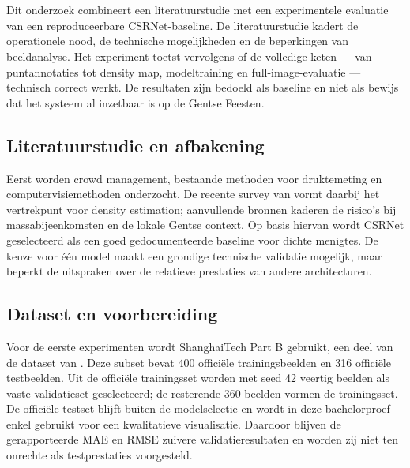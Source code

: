 
\chapter{}%
\label{ch:methodologie}

Dit onderzoek combineert een literatuurstudie met een experimentele evaluatie van een reproduceerbare CSRNet-baseline. De literatuurstudie kadert de operationele nood, de technische mogelijkheden en de beperkingen van beeldanalyse. Het experiment toetst vervolgens of de volledige keten --- van puntannotaties tot density map, modeltraining en full-image-evaluatie --- technisch correct werkt. De resultaten zijn bedoeld als baseline en niet als bewijs dat het systeem al inzetbaar is op de Gentse Feesten.

\section{Literatuurstudie en afbakening}

Eerst worden crowd management, bestaande methoden voor druktemeting en computervisiemethoden onderzocht. De recente survey van \textcite{Gao2025} vormt daarbij het vertrekpunt voor density estimation; aanvullende bronnen kaderen de risico's bij massabijeenkomsten en de lokale Gentse context. Op basis hiervan wordt CSRNet geselecteerd als een goed gedocumenteerde baseline voor dichte menigtes. De keuze voor één model maakt een grondige technische validatie mogelijk, maar beperkt de uitspraken over de relatieve prestaties van andere architecturen.

\section{Dataset en voorbereiding}

Voor de eerste experimenten wordt ShanghaiTech Part B gebruikt, een deel van de dataset van \textcite{Zhang2016}. Deze subset bevat 400 officiële trainingsbeelden en 316 officiële testbeelden. Uit de officiële trainingsset worden met seed 42 veertig beelden als vaste validatieset geselecteerd; de resterende 360 beelden vormen de trainingsset. De officiële testset blijft buiten de modelselectie en wordt in deze bachelorproef enkel gebruikt voor een kwalitatieve visualisatie. Daardoor blijven de gerapporteerde MAE en RMSE zuivere validatieresultaten en worden zij niet ten onrechte als testprestaties voorgesteld.

